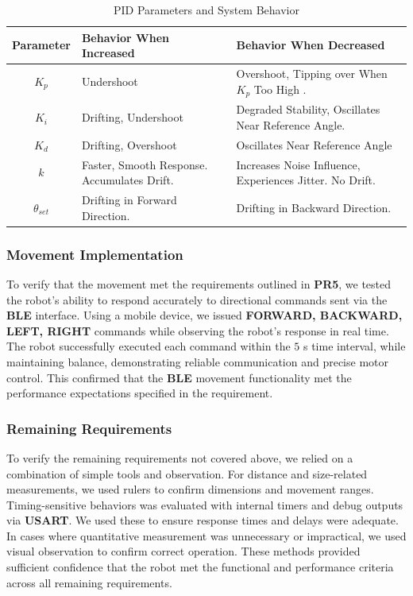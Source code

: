 \documentclass{article}
\begin{document}
\begin{table}[H]
    \centering
    \renewcommand{\arraystretch}{1.3}
    \begin{tabularx}{\textwidth}{|c|X|X|}
        \hline
        \textbf{Parameter} & \textbf{Behavior When Increased} & \textbf{Behavior When Decreased} \\
        \hline
        $K_p$ & Undershoot & Overshoot, Tipping over When $K_p$ Too High .\\
        \hline
        $K_i$ & Drifting, Undershoot & Degraded Stability, Oscillates Near Reference Angle. \\
        \hline
        $K_d$ & Drifting, Overshoot & Oscillates Near Reference Angle \\
        \hline
        $k$ & Faster, Smooth Response. Accumulates Drift. & Increases Noise Influence, Experiences Jitter. No Drift. \\
        \hline
        $\theta_{set}$ & Drifting in Forward Direction. & Drifting in Backward Direction. \\
        \hline
    \end{tabularx}
    \caption{PID Parameters and System Behavior}
    \label{tab:parameter_behavior}
\end{table}

\subsubsection{Movement Implementation}
To verify that the movement met the requirements outlined in \textbf{PR5},
we tested the robot's ability to respond accurately to directional commands sent via the \textbf{BLE} interface.
Using a mobile device, we issued \textbf{FORWARD, BACKWARD, LEFT, RIGHT} commands while observing the robot's response in real time.
The robot successfully executed each command within the $5$ s time interval,
while maintaining balance, demonstrating reliable communication and precise motor control.
This confirmed that the \textbf{BLE} movement functionality met the performance expectations specified in the requirement.

\subsubsection{Remaining Requirements}
To verify the remaining requirements not covered above, we relied on a combination of simple tools and observation.
For distance and size-related measurements, we used rulers to confirm dimensions and movement ranges.
Timing-sensitive behaviors was evaluated with internal timers and debug outputs via \textbf{USART}. We used these to ensure response times and delays were adequate.
In cases where quantitative measurement was unnecessary or impractical, we used visual observation to confirm correct operation.
These methods provided sufficient confidence that the robot met the functional and performance criteria across all remaining requirements.
\end{document}
